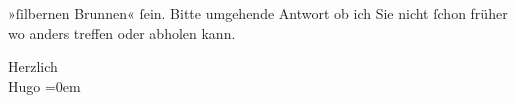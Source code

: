                   »ſilbernen Brunnen«{ }ſein. Bitte umgehende
               Antwort ob ich Sie nicht{ }ſchon früher wo anders treffen oder abholen kann.\pend
           
\pstart
           Herzlich{\\[\baselineskip]}\spacefill\mbox{Hugo}\pend
           \leftskip=0em{}\endnumbering{}  \newcommand{\dateiname}{L00859}\newcommand{\titel}{Hugo von Hofmannsthal an Arthur Schnitzler, 19. 11. 1898}\newcommand{\editorInnen}{Martin Anton Müller und Gerd-Hermann Susen}
